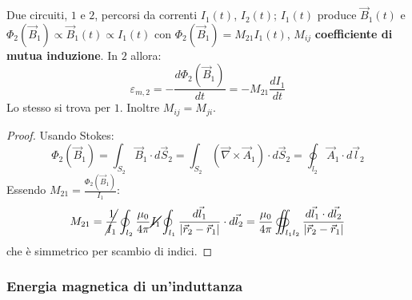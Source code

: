 \documentclass[a4paper]{scrartcl}
\numberwithin{equation}{subsection}
\theoremstyle{style1}
\newenvironment{boxenv}[1][]{
    \begin{eqbox}[#1]
    }{
   \end{eqbox}
}
\begin{document}
Due circuiti, $1$ e $2$, percorsi da correnti $I_1(t)$, $I_2(t)$; $I_1(t)$ produce $\vec{B}_1(t)$ e $\Phi_2(\vec{B}_1) \propto \vec{B}_1(t)\propto I_1(t)$ con $\Phi_2(\vec{B}_1) = M_{21}I_1(t)$, $M_{ij} $ \textbf{coefficiente di mutua induzione}. In $2$ allora:
\begin{equation}
	\varepsilon _{m,2} = -\frac{d \Phi_2(\vec{B}_1)}{d t} = - M_{21} \frac{d I_1}{d t}  
\end{equation}
Lo stesso si trova per $1$. Inoltre $M_{ij} = M_{ji} $.
\begin{boxenv}[]
\begin{proof}
	Usando Stokes:
	\begin{equation}
		\Phi_2(\vec{B}_1) = \int_{S_2} \vec{B}_1 \cdot d\vec{S}_2 = \int_{S_2} (\vec{\nabla }\times \vec{A}_1) \cdot d\vec{S}_2 = \oint_{l_2} \vec{A}_1 \cdot d\vec{l}_2
	\end{equation}
	Essendo $M_{21}= \frac{\Phi_2(\vec{B}_1)}{I_1}$:
	\begin{equation}
		M_{21} = \cancel{\frac{1}{I_1}}\oint_{l_2} \frac{\mu_0}{4\pi}\cancel{I_1} \oint_{l_1} \frac{d\vec{l}_1}{\left\lvert \vec{r}_2 - \vec{r}_1 \right\rvert }\cdot d\vec{l}_2=\frac{\mu_0}{4\pi}\oiint_{l_1l_2} \frac{d\vec{l}_1\cdot d\vec{l}_2}{\left\lvert \vec{r}_2 -\vec{r}_1\right\rvert }
	\end{equation}
	che \`e simmetrico per scambio di indici.
\end{proof}
\end{boxenv}

\subsubsection{Energia magnetica di un'induttanza}
\end{document}

